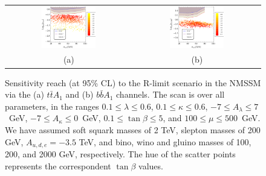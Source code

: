 \documentclass[preprintnumbers,superscriptaddress,nofootinbib,aps,prd,floatfix]{revtex4}
\begin{document}
\begin{enumerate}
\begin{figure}[htbp]
\begin{center}
\begin{tabular}{cc}
\includegraphics[width=0.45\textwidth,natwidth=610,natheight=642]{Figures/pheno/plot_R1_NMSSM.pdf} &
\includegraphics[width=0.45\textwidth,natwidth=610,natheight=642]{Figures/pheno/plot_R3_NMSSM.pdf} \\
(a) & (b) \\
\end{tabular}
\caption{Sensitivity reach (at 95\% CL)  to the R-limit scenario in the NMSSM via the (a) $t\bar{t}A_1$ and (b) $b\bar{b} A_1$ channels. The scan is over all
  parameters, in the ranges $0.1 \leq \lambda \leq 0.6$, $0.1 \leq
  \kappa \leq 0.6$, $-7 \leq A_\lambda \leq 7$~GeV, $-7 \leq A_\kappa \leq 0$~GeV,
  $0.1 \leq \tan \beta \leq 5$, and $100 \leq \mu \leq 500$~GeV.  We
  have assumed soft squark masses of 2 TeV, slepton masses of 200 GeV,
  $A_{u,d,e} = -3.5$ TeV, and bino, wino and gluino masses of
  100, 200, and 2000 GeV, respectively. The hue of the scatter points represents the correspondent $\tan\beta$ values.}
\label{fig:reach_RS} 
\end{center}
\end{figure}



\end{enumerate}
\end{document}
